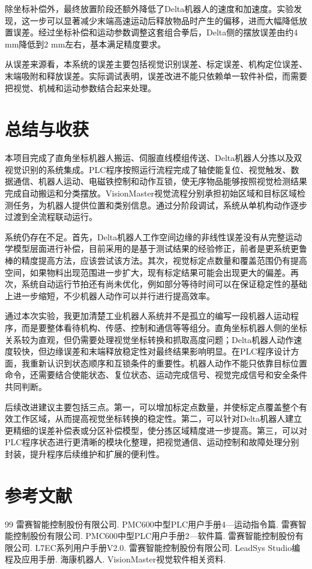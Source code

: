 \documentclass[UTF8,a4paper,12pt,fontset=windows]{ctexart}
\begin{document}
除坐标补偿外，最终放置阶段还额外降低了Delta机器人的速度和加速度。实验发现，这一步可以显著减少末端高速运动后释放物品时产生的偏移，进而大幅降低放置误差。经过坐标补偿和运动参数调整这套组合拳后，Delta侧的摆放误差由约4 mm降低到2 mm左右，基本满足精度要求。

从误差来源看，本系统的误差主要包括视觉识别误差、标定误差、机构定位误差、末端吸附和释放误差。实际调试表明，误差改进不能只依赖单一软件补偿，而需要把视觉、机械和运动参数结合起来处理。

\section{总结与收获}

本项目完成了直角坐标机器人搬运、伺服直线模组传送、Delta机器人分拣以及双视觉识别的系统集成。PLC程序按照运行流程完成了轴使能复位、视觉触发、数据通信、机器人运动、电磁铁控制和动作互锁，使无序物品能够按照视觉检测结果完成自动搬运和分类摆放。VisionMaster视觉流程分别承担初始区域和目标区域检测任务，为机器人提供位置和类别信息。通过分阶段调试，系统从单机构动作逐步过渡到全流程联动运行。

系统仍存在不足。首先，Delta机器人工作空间边缘的非线性误差没有从完整运动学模型层面进行补偿，目前采用的是基于测试结果的经验修正，前者是更系统更鲁棒的精度提高方法，应该尝试该方法。其次，视觉标定点数量和覆盖范围仍有提高空间，如果物料出现范围进一步扩大，现有标定结果可能会出现更大的偏差。再次，系统自动运行节拍还有尚未优化，例如部分等待时间可以在保证稳定性的基础上进一步缩短，不少机器人动作可以并行进行提高效率。

通过本次实验，我更加清楚工业机器人系统并不是孤立的编写一段机器人运动程序，而是要整体看待机构、传感、控制和通信等等组分。直角坐标机器人侧的坐标关系较为直观，但仍需要处理视觉坐标转换和抓取高度问题；Delta机器人动作速度较快，但边缘误差和末端释放稳定性对最终结果影响明显。在PLC程序设计方面，我重新认识到状态顺序和互锁条件的重要性。机器人动作不能只依靠目标位置命令，还需要结合使能状态、复位状态、运动完成信号、视觉完成信号和安全条件共同判断。

后续改进建议主要包括三点。第一，可以增加标定点数量，并使标定点覆盖整个有效工作区域，从而提高视觉坐标转换的稳定性。第二，可以针对Delta机器人建立更精细的误差补偿表或分区补偿模型，使分拣区域精度进一步提高。第三，可以对PLC程序状态进行更清晰的模块化整理，把视觉通信、运动控制和故障处理分别封装，提升程序后续维护和扩展的便利性。

\section{参考文献}

\begin{thebibliography}{99}
   雷赛智能控制股份有限公司. PMC600中型PLC用户手册4---运动指令篇.
   雷赛智能控制股份有限公司. PMC600中型PLC用户手册2---软件篇.
   雷赛智能控制股份有限公司. L7EC系列用户手册V2.0.
   雷赛智能控制股份有限公司. LeadSys Studio编程及应用手册.
   海康机器人. VisionMaster视觉软件相关资料.
\end{thebibliography}
\end{document}
